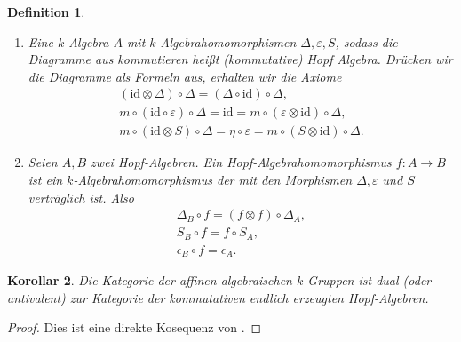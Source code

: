 \documentclass[a4paper, 11pt]{scrartcl}
\newcommand{\id}{\text{id}}
\theoremstyle{basicstyle}
\newtheorem{definition}{Definition}[section]
\newtheorem{korollar}[definition]{Korollar}
\begin{document}
    \begin{definition}\label{def:1}
        \begin{enumerate}
            \item Eine \(k\)-Algebra \(A\) mit \(k\)-Algebrahomomorphismen \(\Delta, \varepsilon, S\), sodass die Diagramme aus  kommutieren heißt \emph{(kommutative) Hopf Algebra}.
                Drücken wir die Diagramme als Formeln aus, erhalten wir die Axiome
                \begin{gather*}
                    (\id \otimes \Delta) \circ \Delta = (\Delta \circ \id) \circ \Delta, \\
                    m \circ (\id \circ \varepsilon) \circ \Delta = \id = m \circ (\varepsilon \otimes \id) \circ \Delta, \\
                    m \circ (\id \otimes S) \circ \Delta = \eta \circ \varepsilon = m \circ (S \otimes \id) \circ \Delta.
                \end{gather*}

            \item Seien \(A, B\) zwei Hopf-Algebren.
                Ein Hopf-Algebrahomomorphismus \(f: A \to B\) ist ein \(k\)-Algebrahomomorphismus der mit den Morphismen \(\Delta, \varepsilon\) und \(S\) verträglich ist.
                Also
                \begin{gather*}
                    \Delta_B \circ f = (f \otimes f) \circ \Delta_A, \\
                    S_B \circ f = f \circ S_A, \\
                    \epsilon_B \circ f = \epsilon_A.
                \end{gather*}
        \end{enumerate}
    \end{definition}

    \begin{korollar}
        Die Kategorie der affinen algebraischen \(k\)-Gruppen ist dual (oder antivalent) zur Kategorie der kommutativen endlich erzeugten Hopf-Algebren.
    \end{korollar}
    \begin{proof}
        Dies ist eine direkte Kosequenz von .
    \end{proof}
\end{document}

